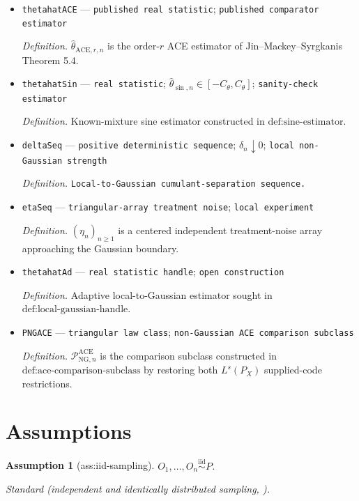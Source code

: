 \documentclass{article}
\newtheorem{assumption}{Assumption}
\begin{document}
\begin{itemize}
  \item \texttt{thetahatACE} --- \texttt{published real statistic}; \texttt{published comparator estimator}
  \par\smallskip\noindent\emph{Definition.} \(\widehat\theta_{\mathrm{ACE},r,n}\) is the order-\(r\) ACE estimator of Jin--Mackey--Syrgkanis Theorem 5.4.
  \item \texttt{thetahatSin} --- \texttt{real statistic}; \(\widehat\theta_{\sin,n}\in[-C_{\theta},C_{\theta}]\); \texttt{sanity-\allowbreak{}check estimator}
  \par\smallskip\noindent\emph{Definition.} Known-mixture sine estimator constructed in \(\text{def:sine-estimator}\).
  \item \texttt{deltaSeq} --- \texttt{positive deterministic sequence}; \(\delta_n\downarrow0\); \texttt{local non-\allowbreak{}Gaussian strength}
  \par\smallskip\noindent\emph{Definition.} \texttt{Local-\allowbreak{}to-\allowbreak{}Gaussian cumulant-\allowbreak{}separation sequence.}
  \item \texttt{etaSeq} --- \texttt{triangular-\allowbreak{}array treatment noise}; \texttt{local experiment}
  \par\smallskip\noindent\emph{Definition.} \((\eta_n)_{n\ge1}\) is a centered independent treatment-noise array approaching the Gaussian boundary.
  \item \texttt{thetahatAd} --- \texttt{real statistic handle}; \texttt{open construction}
  \par\smallskip\noindent\emph{Definition.} Adaptive local-to-Gaussian estimator sought in \(\text{def:local-gaussian-handle}\).
  \item \texttt{PNGACE} --- \texttt{triangular law class}; \texttt{non-\allowbreak{}Gaussian ACE comparison subclass}
  \par\smallskip\noindent\emph{Definition.} \(\mathcal P_{\mathrm{NG},n}^{\mathrm{ACE}}\) is the comparison subclass constructed in \(\text{def:ace-comparison-subclass}\) by restoring both \(L^s(P_X)\) supplied-code restrictions.
\end{itemize}

\section{Assumptions}

\begin{assumption}[ass:iid-sampling]\label{ass:iid-sampling}
\(O_1,\ldots,O_n\stackrel{\mathrm{iid}}{\sim}P\).
\par\smallskip\noindent\emph{Standard} (independent and identically distributed sampling, \cite{ChernozhukovEtAl2018DML}).
\end{assumption}
\end{document}
